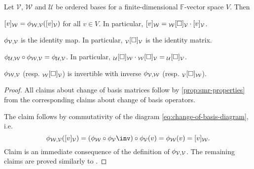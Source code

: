 \documentclass[a4paper, 11pt]{memoir}
\theoremstyle{plaincustomnumber}
\theoremstyle{changedotbreakcustomnumber}
\newcommand{\calV}{\mathcal{V}}
\newcommand{\calW}{\mathcal{W}}
\newcommand{\calU}{\mathcal{U}}
\newcommand{\field}{\mathbb{F}}
\begin{document}
\begin{proposition}
    Let $\calV$, $\calW$ and $\calU$ be ordered bases for a finite-dimensional $\field$-vector space $V$. Then
    \begin{enumprop}
        \item \label{enum:basis-change-coordvec} $\coordvec{v}{\calW} = \basischange{\calW}{\calV} (\coordvec{v}{\calV})$ for all $v \in V$. In particular, $\coordvec{v}{\calW} = \basischangemat{\calW}{\calV} \cdot \coordvec{v}{\calV}$.

        \item \label{enum:basis-change-identity-map} $\basischange{\calV}{\calV}$ is the identity map. In particular, $\basischangemat{\calV}{\calV}$ is the identity matrix.

        \item $\basischange{\calU}{\calW} \circ \basischange{\calW}{\calV} = \basischange{\calU}{\calV}$. In particular, $\basischangemat{\calU}{\calW} \cdot \basischangemat{\calW}{\calV} = \basischangemat{\calU}{\calV}$.

        \item $\basischange{\calW}{\calV}$ (resp. $\basischangemat{\calW}{\calV}$) is invertible with inverse $\basischange{\calV}{\calW}$ (resp. $\basischangemat{\calV}{\calW}$).
    \end{enumprop}
\end{proposition}

\begin{proof}
    All claims about change of basis matrices follow by \cref{prop:smr-properties} from the corresponding claims about change of basis operators.

    The claim  follows by commutativity of the diagram \cref{eq:change-of-basis-diagram}, i.e.
    \begin{equation*}
        \basischange{\calW}{\calV} (\coordvec{v}{\calV})
            = (\coordmap{\calW} \circ \coordmap{\calV}\inv) \circ \coordmap{\calV}(v)
            = \coordmap{\calW}(v)
            = \coordvec{v}{\calW}.
    \end{equation*}
    Claim  is an immediate consequence of the definition of $\basischange{\calV}{\calV}$. The remaining claims are proved similarly to .
\end{proof}


\newpar\label{par:matrix-rep}
\end{document}
